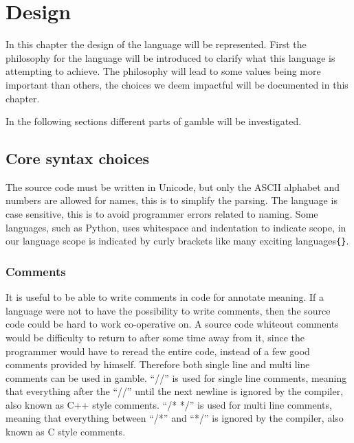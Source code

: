 \chapter{Design}
\label{cha:Design}
In this chapter the design of the language will be represented.
First the philosophy for the language will be introduced to clarify what this language is attempting to achieve.
The philosophy will lead to some values being more important than others, the choices we deem impactful will be documented in this chapter.



In the following sections different parts of \gls{gamble} will be investigated.

\section{Core syntax choices}

The source code must be written in Unicode, but only the ASCII alphabet and numbers are allowed for names, this is to simplify the parsing. 
The language is case sensitive, this is to avoid programmer errors related to naming. 
Some languages, such as Python, uses whitespace and indentation to indicate scope, in our language scope is indicated by curly brackets like many exciting languages\texttt{\{\}}.  

\subsection*{Comments}
It is useful to be able to write comments in code for annotate meaning.
If a language were not to have the possibility to write comments, then the source code could be hard to work co-operative on.
A source code whiteout comments would be difficulty to return to after some time away from it, since the programmer would have to reread the entire code, instead of a few good comments provided by himself.\citep{Commenting}
Therefore both single line and multi line comments can be used in \gls{gamble}. 
``//'' is used for single line comments, meaning that everything after the ``//'' until the next newline is ignored by the compiler, also known as C++ style comments. 
``/* */'' is used for multi line comments, meaning that everything between ``/*'' and ``*/'' is ignored by the compiler, also known as C style comments. 

